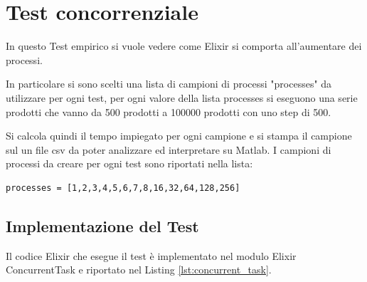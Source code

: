 \section{Test concorrenziale}\label{sec:test_concorrenziale}

In questo Test empirico si vuole vedere come Elixir
si comporta all'aumentare dei processi.

In particolare si sono scelti una lista di campioni
di processi "processes" da utilizzare per ogni test, per ogni
valore della lista processes
si eseguono una serie prodotti che vanno da 500 prodotti
a 100000 prodotti con uno step di 500.

Si calcola quindi il tempo impiegato per ogni campione
e si stampa il campione sul un file csv da poter analizzare
ed interpretare su Matlab.
I campioni di processi da creare per ogni test
sono riportati nella lista:
\begin{lstlisting}[language=none]
processes = [1,2,3,4,5,6,7,8,16,32,64,128,256]
\end{lstlisting}

\subsection{Implementazione del Test}

Il codice Elixir che esegue il test è
implementato nel modulo Elixir ConcurrentTask e
riportato nel Listing \ref{lst:concurrent_task}.


